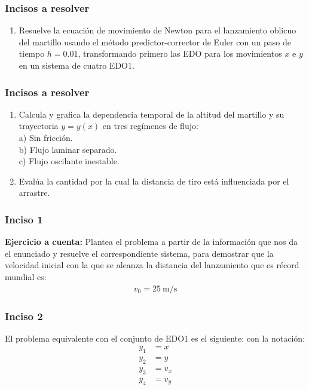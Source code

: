 \documentclass[12pt]{beamer}
\begin{document}
\begin{frame}
\frametitle{Incisos a resolver}
\begin{enumerate}[<+->]
\conti
\item Resuelve la ecuación de movimiento de Newton para el lanzamiento oblicuo del martillo usando el método predictor-corrector de Euler con un paso de tiempo $h = 0.01$, transformando primero las EDO para los movimientos $x$ e $y$ en un sistema de cuatro EDO1.
\seti
\end{enumerate}
\end{frame}
\begin{frame}
\frametitle{Incisos a resolver}
\begin{enumerate}[<+->]
\conti
\item Calcula y grafica la dependencia temporal de la altitud del martillo y su trayectoria $y = y (x)$ en tres regímenes de flujo:
\\
a) Sin fricción. \\
b) Flujo laminar separado. \\
c) Flujo oscilante inestable.
\item Evalúa la cantidad por la cual la distancia de tiro está influenciada por el arrastre.
\end{enumerate}
\end{frame}
\begin{frame}
\frametitle{Inciso 1}
\textbf{Ejercicio a cuenta:} Plantea el problema a partir de la información que nos da el enunciado y resuelve el correspondiente sistema, para demostrar que la velocidad inicial con la que se alcanza la distancia del lanzamiento que es récord mundial es:
\pause
\begin{align*}
v_{0} =  \SI{25}{\meter\per\second}
\end{align*}
\end{frame}
\begin{frame}
\frametitle{Inciso 2}
El problema equivalente con el conjunto de EDO1 es el siguiente: \pause con la notación:
\pause
\begin{align*}
y_{1} &= x \\
y_{2} &= y \\
y_{3} &= v_{x} \\
y_{4} &= v_{y} \\
\end{align*}
\end{frame}
\end{document}
